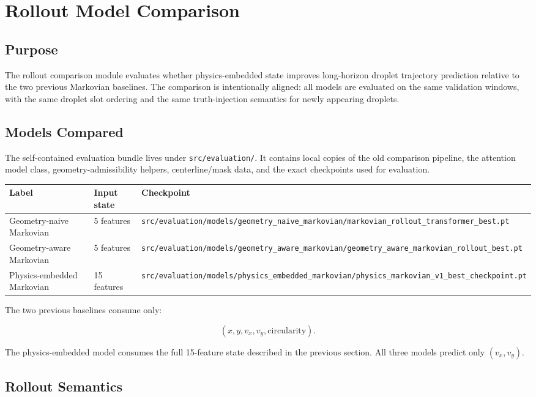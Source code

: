\section{Rollout Model Comparison}

\subsection{Purpose}

The rollout comparison module evaluates whether physics-embedded state improves
long-horizon droplet trajectory prediction relative to the two previous
Markovian baselines.  The comparison is intentionally aligned: all models are
evaluated on the same validation windows, with the same droplet slot ordering
and the same truth-injection semantics for newly appearing droplets.

\subsection{Models Compared}

The self-contained evaluation bundle lives under \texttt{src/evaluation/}.  It
contains local copies of the old comparison pipeline, the attention model class,
geometry-admissibility helpers, centerline/mask data, and the exact checkpoints
used for evaluation.

\begin{longtable}{@{}lll@{}}
\toprule
Label & Input state & Checkpoint \\
\midrule
Geometry-naive Markovian & 5 features &
\texttt{src/evaluation/models/geometry\_naive\_markovian/markovian\_rollout\_transformer\_best.pt} \\
Geometry-aware Markovian & 5 features &
\texttt{src/evaluation/models/geometry\_aware\_markovian/geometry\_aware\_markovian\_rollout\_best.pt} \\
Physics-embedded Markovian & 15 features &
\texttt{src/evaluation/models/physics\_embedded\_markovian/physics\_markovian\_v1\_best\_checkpoint.pt} \\
\bottomrule
\end{longtable}

The two previous baselines consume only:

\[
(x,y,v_x,v_y,\mathrm{circularity}).
\]

The physics-embedded model consumes the full 15-feature state described in the
previous section.  All three models predict only \((v_x,v_y)\).

\subsection{Rollout Semantics}

